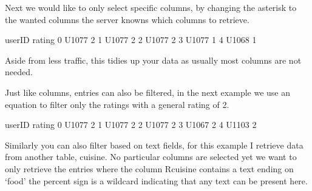 \documentclass[letterpaper,10pt,english]{jupyterBook}
\begin{document}
\sphinxAtStartPar
Next we would like to only select specific columns, by changing the asterisk to the wanted columns the server knowns which columns to retrieve.

\begin{sphinxVerbatim}[commandchars=\\\{\}]
  
\end{sphinxVerbatim}

\begin{sphinxVerbatim}[commandchars=\\\{\}]
  userID  rating
0  U1077       2
1  U1077       2
2  U1077       2
3  U1077       1
4  U1068       1
\end{sphinxVerbatim}

\sphinxAtStartPar
Aside from less traffic, this tidies up your data as usually most columns are not needed.

\sphinxAtStartPar
Just like columns, entries can also be filtered, in the next example we use an equation to filter only the ratings with a general rating of 2.

\begin{sphinxVerbatim}[commandchars=\\\{\}]
  
\end{sphinxVerbatim}

\begin{sphinxVerbatim}[commandchars=\\\{\}]
  userID  rating
0  U1077       2
1  U1077       2
2  U1077       2
3  U1067       2
4  U1103       2
\end{sphinxVerbatim}

\sphinxAtStartPar
Similarly you can also filter based on text fields, for this example I retrieve data from another table, cuisine.
No particular columns are selected yet we want to only retrieve the entries where the column Rcuisine contains a text ending on ‘food’ the percent sign is a wildcard indicating that any text can be present here.
\end{document}
